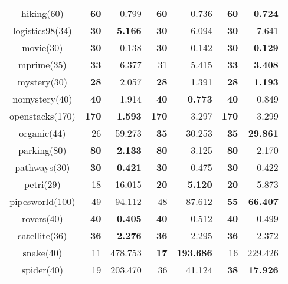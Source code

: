 \begin{center}
\begin{tabular}{c rr rr rr}
    hiking(60)      & \textbf{60}   & 0.799             & \textbf{60}   & 0.736               & \textbf{60}   & \textbf{0.724} \\
    logistics98(34) & \textbf{30}   & \textbf{5.166}    & \textbf{30}   & 6.094               & \textbf{30}   & 7.641 \\
    movie(30)       & \textbf{30}   & 0.138             & \textbf{30}   & 0.142               & \textbf{30}   & \textbf{0.129} \\
    mprime(35)      & \textbf{33}   & 6.377             & 31            & 5.415               & \textbf{33}   & \textbf{3.408} \\
    mystery(30)     & \textbf{28}   & 2.057             & \textbf{28}   & 1.391               & \textbf{28}   & \textbf{1.193} \\
    nomystery(40)   & \textbf{40}   & 1.914             & \textbf{40}   & \textbf{0.773}      & \textbf{40}   & 0.849 \\
    openstacks(170) & \textbf{170}  & \textbf{1.593}    & \textbf{170}  & 3.297               & \textbf{170}  & 3.299 \\
    organic(44)     & 26            & 59.273            & \textbf{35}   & 30.253              & \textbf{35}   & \textbf{29.861} \\
    parking(80)     & \textbf{80}   & \textbf{2.133}    & \textbf{80}   & 3.125               & \textbf{80}   & 2.170 \\
    pathways(30)    & \textbf{30}   & \textbf{0.421}    & \textbf{30}   & 0.475               & \textbf{30}   & 0.422 \\
    petri(29)       & 18            & 16.015            & \textbf{20}   & \textbf{5.120}      & \textbf{20}   & 5.873 \\
    pipesworld(100) & 49            & 94.112            & 48            & 87.612              & \textbf{55}   & \textbf{66.407} \\
    rovers(40)      & \textbf{40}   & \textbf{0.405}    & \textbf{40}   & 0.512               & \textbf{40}   & 0.499 \\
    satellite(36)   & \textbf{36}   & \textbf{2.276}    & \textbf{36}   & 2.295               & \textbf{36}   & 2.372 \\
    snake(40)       & 11            & 478.753           & \textbf{17}   & \textbf{193.686}    & 16            & 229.426 \\
    spider(40)      & 19            & 203.470           & 36            & 41.124              & \textbf{38}   & \textbf{17.926} \\

\end{tabular}
\end{center}
